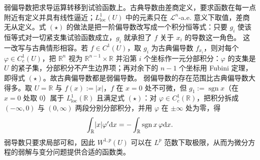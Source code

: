 \documentclass[../../main.tex]{subfiles}%
\begin{document}
\begin{remark}\label{remark:ch04-def-4-1-动机}
弱偏导数把求导运算转移到试验函数上。古典导数由差商定义，要求函数在每一点附近有定义并具有线性逼近；$L^{1}_{\mathrm{loc}}(U)$ 中的元素只在 $\mathcal{L}^{n}$-a.e. 意义下取值，差商无从定义。式 $(\star)$ 的做法是把一阶偏导数改写成一个积分恒等式：只要 $g_i$ 使该恒等式对一切紧支集试验函数成立，$g_i$ 就承担了 $f$ 关于 $x_i$ 的导数这一角色。
这一改写与古典情形相容。若 $f\in C^{1}(U)$，取 $g_i$ 为古典偏导数 $f_{x_i}$，则对每个 $\varphi\in C_c^{1}(U)$，把 $\mathbb{R}^{n}$ 视为 $\mathbb{R}^{n-1}\times\mathbb{R}$ 并沿第 $i$ 个坐标作一元分部积分：$\varphi$ 的支集是 $U$ 的紧子集，分部积分不产生边界项；再对余下的 $n-1$ 个坐标用 Fubini 定理，即得式 $(\star)$。故古典偏导数都是弱偏导数。
弱偏导数的存在范围比古典偏导数大得多。取 $U=\mathbb{R}$ 与 $f(x):=\lvert x\rvert$，$f$ 在 $x=0$ 处不可微，但 $g_1:=\operatorname{sgn}x$（在 $x=0$ 处取 $0$）属于 $L^{1}_{\mathrm{loc}}(\mathbb{R})$ 且满足式 $(\star)$：对 $\varphi\in C_c^{1}(\mathbb{R})$，把积分拆成 $(-\infty,0)$ 与 $(0,\infty)$ 两段分别分部积分，并用 $\varphi$ 在 $\pm\infty$ 处为零，得
\begin{align*}
\int_{\mathbb{R}}\lvert x\rvert\varphi'\mathrm{d} x=-\int_{\mathbb{R}}\operatorname{sgn}x\,\varphi\mathrm{d} x .
\end{align*}
弱导数只要求局部可和，因此 $W^{1,p}(U)$ 可以在 $L^{p}$ 范数下取极限，从而为微分方程的弱解与变分问题提供合适的函数类。
\end{remark}
\end{document}
